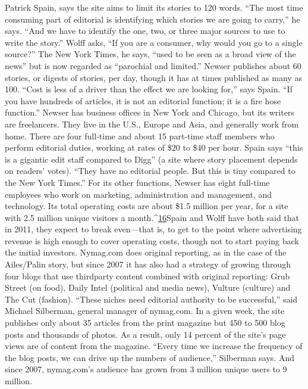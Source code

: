 Patrick Spain, says the site aims to limit its stories to 120 words. ``The most time
consuming part of editorial is identifying which stories we are going to carry,''
he says. ``And we have to identify the one, two, or three major sources to use to
write the story.'' Wolff asks, ``If you are a consumer, why would you go to a single
source?'' The New York Times, he says, ``used to be seen as a broad view of the
news'' but is now regarded as ``parochial and limited.'' Newser publishes about 60
stories, or digests of stories, per day, though it has at times published as many as
100. ``Cost is less of a driver than the effect we are looking for,'' says Spain. ``If you
have hundreds of articles, it is not an editorial function; it is a fire hose function.''
Newser has business offices in New York and Chicago, but its writers are freelancers.
They live in the U.S., Europe and Asia, and generally work from home.
There are four full-time and about 15 part-time staff members who perform
editorial duties, working at rates of \$20 to \$40 per hour. Spain says ``this is a
gigantic edit staff compared to Digg'' (a site where story placement depends on
readers' votes). ``They have no editorial people. But this is tiny compared to the
New York Times.''
For its other functions, Newser has eight full-time employees who work on
marketing, administration and management, and technology. Its total operating
costs are about \$1.5 million per year, for a site with 2.5 million unique visitors
a month.^{\href{#endnotes-chapter-6}{16}}Spain and Wolff have both said that in 2011, they expect to break
even—that is, to get to the point where advertising revenue is high enough to
cover operating costs, though not to start paying back the initial investors.
Nymag.com does original reporting, as in the case of the Ailes/Palin story, but
since 2007 it has also had a strategy of growing through four blogs that use thirdparty
content combined with original reporting: Grub Street (on food), Daily
Intel (political and media news), Vulture (culture) and The Cut (fashion). ``These
niches need editorial authority to be successful,'' said Michael Silberman, general
manager of nymag.com. In a given week, the site publishes only about 35 articles
from the print magazine but 450 to 500 blog posts and thousands of photos. As a
result, only 14 percent of the site's page views are of content from the magazine.
``Every time we increase the frequency of the blog posts, we can drive up the
numbers of audience,'' Silberman says. And since 2007, nymag.com's audience
has grown from 3 million unique users to 9 million.

